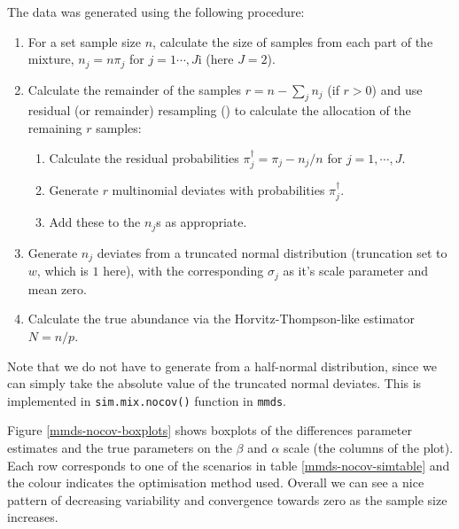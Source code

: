 The data was generated using the following procedure:
\begin{enumerate}
	\item For a set sample size $n$, calculate the size of samples from each part of the mixture, $n_j = n \pi_j$ for $j=1\cdots,J$i (here $J=2$).
	\item Calculate the remainder of the samples $r = n-\sum_j n_j $ (if $r>0$) and use residual (or remainder) resampling (\cite{baker1985}) to calculate the allocation of the remaining $r$ samples:
	\begin{enumerate}
		\item Calculate the residual probabilities $\pi_j^\dagger = \pi_j - n_j/n$ for $j=1,\cdots,J$.
		\item Generate $r$ multinomial deviates with probabilities $\pi_j^\dagger$.
		\item Add these to the $n_j$s as appropriate.
	\end{enumerate}
	\item Generate $n_j$ deviates from a truncated normal distribution (truncation set to $w$, which is $1$ here), with the corresponding $\sigma_j$ as it's scale parameter and mean zero.
	\item Calculate the true abundance via the Horvitz-Thompson-like estimator $N=n/p$.
\end{enumerate}
Note that we do not have to generate from a half-normal distribution, since we can simply take the absolute value of the truncated normal deviates. This is implemented in \texttt{sim.mix.nocov()} function in \texttt{mmds}.

Figure \ref{mmds-nocov-boxplots} shows boxplots of the differences parameter estimates  and the true parameters on the $\beta$ and $\alpha$ scale (the columns of the plot). Each row corresponds to one of the scenarios in table \ref{mmds-nocov-simtable} and the colour indicates the optimisation method used. Overall we can see a nice pattern of decreasing variability and convergence towards zero as the sample size increases.

